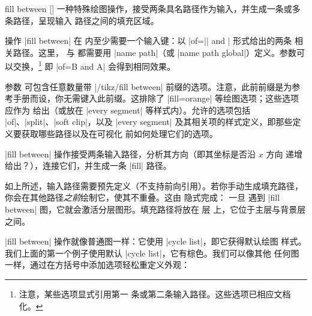 \begin{addplotoperation}[]{fill between}{%
    []
}
    一种特殊绘图操作，接受两条具名路径作为输入，并生成一条或多条路径，呈现输入
    路径之间的填充区域。
\begin{codeexample}[]
\end{codeexample}
    操作 |fill between| 在
    内至少需要一个输入键：以 |of=|| and | 形式给出的两条
    相关路径。这里， 与  都需要用 |name path|（或
    |name path global|）定义。参数可以交换，\footnote{注意，某些选项显式引用第一
    条或第二条输入路径。这些选项已相应文档化。}
    即 |of=B and A| 会得到相同效果。

    参数  可包含任意数量带 |/tikz/fill between|
    前缀的选项。注意，此前前缀是为参考手册而设，你无需键入此前缀。这排除了
    |fill=orange| 等绘图选项；这些选项应作为  给出（或放在
    |every segment| 等样式内）。允许的选项包括 |of|、|split|、|soft clip|，以及
    |every segment| 及其相关项的样式定义，即那些定义要获取哪些路径以及在可视化
    前如何处理它们的选项。

    |fill between| 操作接受两条输入路径，分析其方向（即其坐标是否沿 $x$ 方向
    递增给出？），连接它们，并生成一条 |fill| 路径。

    如上所述，输入路径需要预先定义（不支持前向引用）。若你手动生成填充路径，
    你会在其他路径\emph{之前}绘制它，使其不重叠。这由 \PGFPlots{} 隐式完成：
    一旦 \PGFPlots{} 遇到 |fill between| 图，它就会激活分层图形。填充路径将放在
    层  上，它位于主层与背景层之间。

    |fill between| 操作就像普通图一样：它使用 |cycle list|，即它获得默认绘图
    样式。我们上面的第一个例子使用默认 |cycle list|，它有棕色。我们可以像其他
    任何图一样，通过在方括号中添加选项轻松重定义外观：
\begin{codeexample}[]
\end{codeexample}
\end{addplotoperation}

